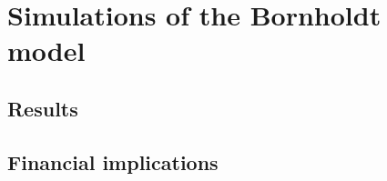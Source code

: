 \chapter{Simulations of the Bornholdt model}\label{ch:chapter3}
\section{Results}

\section{Financial implications}